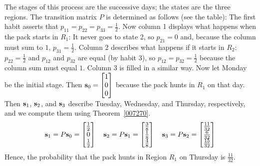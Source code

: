 \documentclass{ximera}
\begin{document}
\begin{example}
\begin{explanation}
  The stages of this process are the successive days; the states are the three regions. The transition matrix $P$ is determined as follows (see the table): The first habit asserts that $p_{11} = p_{22} = p_{33} = \frac{1}{2}$. Now column 1 displays what happens when the pack starts in $R_{1}$: It never goes to state 2, so $p_{21} = 0$ and, because the column must sum to $1$, $p_{31} = \frac{1}{2}$. Column 2 describes what happens if it starts in $R_{2}$: $p_{22} = \frac{1}{2}$ and $p_{12}$ and $p_{32}$ are equal (by habit 3), so $p_{12} = p_{32} = \frac{1}{2}$ because the column sum must equal $1$. Column 3 is filled in a similar way.
Now let Monday be the initial stage. Then ${\bf s}_0 = \begin{bmatrix}
1 \\
0 \\
0
\end{bmatrix}$
 because the pack hunts in $R_{1}$ on that day. Then ${\bf s}_{1}$, ${\bf s}_{2}$, and ${\bf s}_{3}$ describe Tuesday, Wednesday, and Thursday, respectively, and we compute them using Theorem~\ref{007270}.
\begin{equation*}
{\bf s}_1 = P{\bf s}_0 = \begin{bmatrix}
\frac{1}{2} \\
0 \\
\frac{1}{2}
\end{bmatrix} \quad
{\bf s}_2 = P{\bf s}_1 = \begin{bmatrix}
\frac{3}{8} \\
\frac{1}{8} \\
\frac{4}{8}
\end{bmatrix} \quad
{\bf s}_3 = P{\bf s}_2 = \begin{bmatrix}
\frac{11}{32} \\
\frac{6}{32} \\
\frac{15}{32}
\end{bmatrix}
\end{equation*}
Hence, the probability that the pack hunts in Region $R_{1}$ on Thursday is $\frac{11}{32}$.
\end{explanation}
\end{example}
\end{document}
